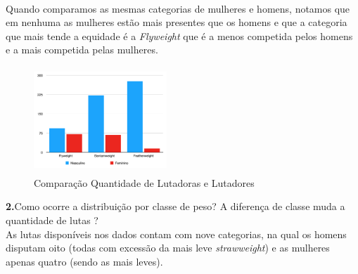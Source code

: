 \documentclass{article}
\begin{document}
\begin{figure}[H]
\centering
{}
\end{figure}
\\

Quando comparamos as mesmas categorias de mulheres e homens, notamos que em nenhuma as mulheres estão mais presentes que os homens e que a categoria que mais tende a equidade é a \textit{Flyweight} que é a menos competida pelos homens e a mais competida pelas mulheres.\\

\begin{figure}[H]
    \centering
    \includegraphics[width=5cm,height=4cm]{Comparação Quantidade de Lutadoras e Lutadores}
    \caption{Comparação Quantidade de Lutadoras e Lutadores}
    \label{fig:my_label}
\end{figure}

\textbf{2.}Como ocorre a distribuição por classe de peso? A diferença de classe muda a quantidade de lutas ?\\

As lutas disponíveis nos dados contam com nove categorias, na qual os homens disputam oito (todas com excessão da mais leve \textit{strawweight}) e as mulheres apenas quatro (sendo as mais leves). \\
\end{document}
